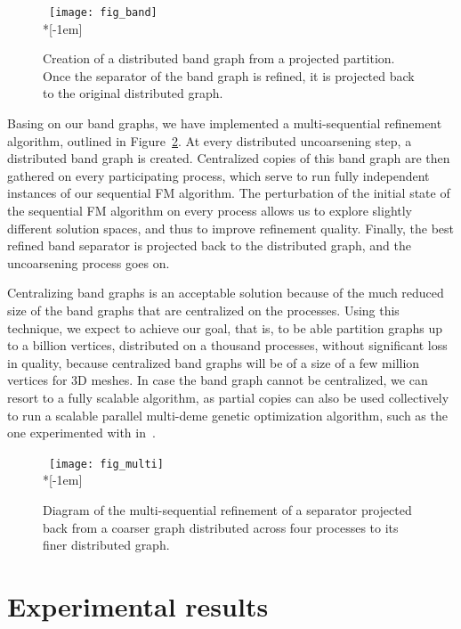 \documentclass[fleqn,12pt,twoside]{article}
\begin{document}
\begin{figure}
~\hfill \texttt{[image: fig\_band]}
\hfill~\\*[-1em]
\caption{Creation of a distributed band graph from a projected
  partition. Once the separator of the band graph is refined, it
  is projected back to the original distributed graph.}
\label{fig-band}
\end{figure}

Basing on our band graphs, we have implemented a multi-sequential
refinement algorithm, outlined in Figure~\ref{fig-multi}. At every
distributed uncoarsening step, a distributed band graph is
created. Centralized copies of this band graph are then gathered on
every participating process, which serve to run fully independent
instances of our sequential FM algorithm. The perturbation of the
initial state of the sequential FM algorithm on every process allows
us to explore slightly different solution spaces, and thus to improve
refinement quality. Finally, the best refined band separator is
projected back to the distributed graph, and the uncoarsening process
goes on.

Centralizing band graphs is an acceptable solution because of the
much reduced size of the band graphs that are centralized on the
processes. Using this technique, we expect to achieve our goal,
that is, to be able partition graphs up to a billion vertices,
distributed on a thousand processes, without significant loss in
quality, because centralized band graphs will be of a size of a few
million vertices for 3D meshes.
In case the band graph cannot be centralized, we can resort to a
fully scalable algorithm, as partial copies can also be used
collectively to run a scalable parallel multi-deme genetic
optimization algorithm, such as the one experimented with
in~\cite{chpe06a}.

\begin{figure}
~\hfill \texttt{[image: fig\_multi]}
\hfill~\\*[-1em]
\caption{Diagram of the multi-sequential refinement of a separator
  projected back from a coarser graph distributed across four processes
  to its finer distributed graph.}
\label{fig-multi}
\end{figure}



\section{Experimental results}
\label{secresult}
\end{document}
